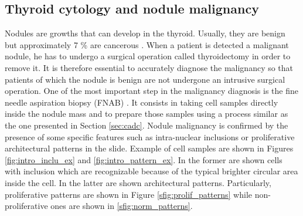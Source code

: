\subsection{Thyroid cytology and nodule malignancy}
\label{ssec:intro_thyroid_case}
Nodules are growths that can develop in the thyroid. Usually, they are benign but approximately 7 \% are cancerous \cite{gopinath2013computer}. When a patient is detected a malignant nodule, he has to undergo a surgical operation called thyroidectomy in order to remove it. It is therefore essential to accurately diagnose the malignancy so that patients of which the nodule is benign are not undergone an intrusive surgical operation. One of the most important step in the malignancy diagnosis is the fine needle aspiration biopsy (FNAB) \cite{bomeli2010evaluation}. It consists in taking cell samples directly inside the nodule mass and to prepare those samples using a process similar as the one presented in Section \ref{sec:cadc}. Nodule malignancy is confirmed by the presence of some specific features such as intra-nuclear inclusions or proliferative architectural patterns in the slide. Example of cell samples are shown in Figures \ref{fig:intro_inclu_ex} and \ref{fig:intro_pattern_ex}. In the former are shown cells with inclusion which are recognizable because of the typical brighter circular area inside the cell. In the latter are shown architectural patterns. Particularly, proliferative patterns are shown in Figure \ref{sfig:prolif_patterns} while non-proliferative ones are shown in \ref{sfig:norm_patterns}. 

